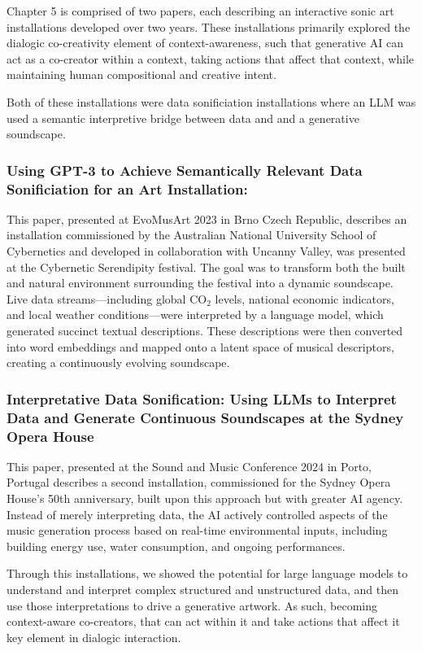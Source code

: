 Chapter 5 is comprised of two papers, each describing an interactive sonic art installations developed over two years. These installations primarily explored the dialogic co-creativity element of context-awareness, such that generative AI can act as a co-creator within a context, taking actions that affect that context, while maintaining human compositional and creative intent. 

Both of these installations were data sonificiation installations where an LLM was used a semantic interpretive bridge between data and and a generative soundscape. 

\subsubsection{Using GPT-3 to Achieve Semantically Relevant Data Sonificiation for an Art Installation: } This paper, presented at EvoMusArt 2023 in Brno Czech Republic, describes an installation commissioned by the Australian National University School of Cybernetics and developed in collaboration with Uncanny Valley, was presented at the Cybernetic Serendipity festival. The goal was to transform both the built and natural environment surrounding the festival into a dynamic soundscape. Live data streams—including global CO$_2$ levels, national economic indicators, and local weather conditions—were interpreted by a language model, which generated succinct textual descriptions. These descriptions were then converted into word embeddings and mapped onto a latent space of musical descriptors, creating a continuously evolving soundscape.

\subsubsection{Interpretative Data Sonification: Using LLMs to Interpret Data and Generate Continuous Soundscapes at the Sydney Opera House} This paper, presented at the Sound and Music Conference 2024 in Porto, Portugal describes a second installation, commissioned for the Sydney Opera House’s 50th anniversary, built upon this approach but with greater AI agency. Instead of merely interpreting data, the AI actively controlled aspects of the music generation process based on real-time environmental inputs, including building energy use, water consumption, and ongoing performances.

Through this installations, we showed the potential for large language models to understand and interpret complex structured and unstructured data, and then use those interpretations to drive a generative artwork. As such, becoming context-aware co-creators, that can act within it and take actions that affect it key element in dialogic interaction. 

